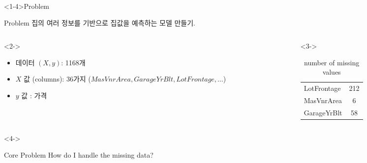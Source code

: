\documentclass[aspectratio=169]{beamer}
\begin{document}
\begin{frame}<1-4>{Problem}
    \begin{block}{Problem}
        집의 여러 정보를 기반으로 집값을 예측하는 모델 만들기.
    \end{block}
        
    \begin{columns}
        \begin{column}[t]{0.48\textwidth}
            \begin{uncoverenv}<2->
                \begin{itemize}
                    \item 데이터 $(X,y)$: 1168개 %
                    \item $X$ 값 (columns): 36가지 ($MasVnrArea, GarageYrBlt, LotFrontage, \dots$)
                    \item $y$ 값 : 가격
                \end{itemize}
            \end{uncoverenv}
        \end{column}
        \begin{column}[t]{0.48\textwidth}
            \begin{uncoverenv}<3->
                \begin{table}
                    \centering
                    \begin{tabular}{lc}
                        \toprule
                        LotFrontage & 212 \\
                        MasVnrArea & 6 \\
                        GarageYrBlt & 58 \\
                        \bottomrule
                    \end{tabular}
                    \caption{number of missing values}
                \end{table}
            \end{uncoverenv}
        \end{column}
    \end{columns}

    \begin{uncoverenv}<4->
        \begin{alertblock}{Core Problem}
            How do I handle the missing data?
        \end{alertblock}
    \end{uncoverenv}
\end{frame}
\end{document}
